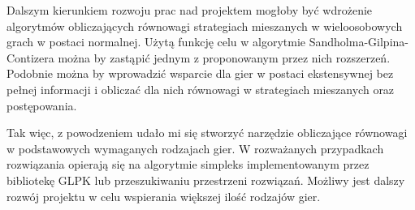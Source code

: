 \documentclass[polish]{standalone}
\begin{document}
Dalszym kierunkiem rozwoju prac nad projektem mogłoby być wdrożenie algorytmów obliczających równowagi strategiach
mieszanych w wieloosobowych grach w postaci normalnej. Użytą funkcję celu w algorytmie Sandholma-Gilpina-Contizera można
by zastąpić jednym z proponowanym przez nich rozszerzeń. Podobnie można by wprowadzić wsparcie dla gier w postaci
ekstensywnej bez pełnej informacji i obliczać dla nich równowagi w strategiach mieszanych oraz postępowania.

Tak więc, z powodzeniem udało mi się stworzyć narzędzie obliczające równowagi w podstawowych wymaganych rodzajach gier.
W rozważanych przypadkach rozwiązania opierają się na algorytmie simpleks implementowanym przez bibliotekę GLPK lub
przeszukiwaniu przestrzeni rozwiązań. Możliwy jest dalszy rozwój projektu w celu wspierania większej ilość rodzajów
gier.
\end{document}
